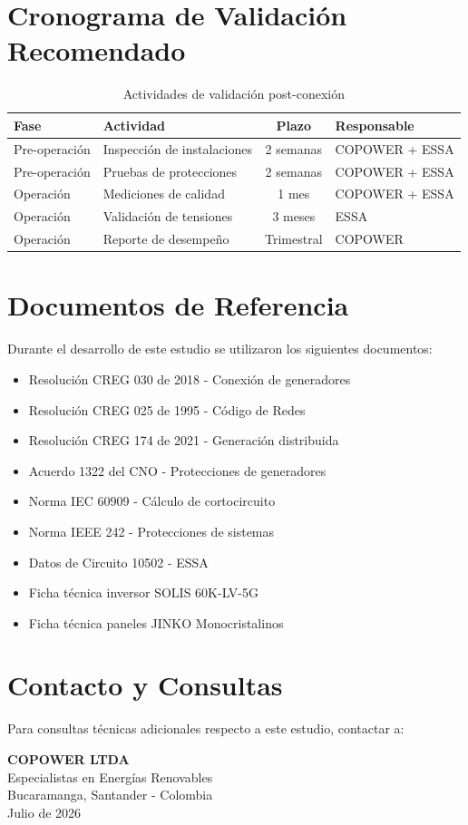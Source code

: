 \section{Cronograma de Validación Recomendado}

\begin{table}[H]
    \centering
    \caption{Actividades de validación post-conexión}
    \begin{tabular}{llcl}
    \toprule
    \textbf{Fase} & \textbf{Actividad} & \textbf{Plazo} & \textbf{Responsable} \\
    \midrule
    Pre-operación & Inspección de instalaciones & 2 semanas & COPOWER + ESSA \\
    Pre-operación & Pruebas de protecciones & 2 semanas & COPOWER + ESSA \\
    Operación & Mediciones de calidad & 1 mes & COPOWER + ESSA \\
    Operación & Validación de tensiones & 3 meses & ESSA \\
    Operación & Reporte de desempeño & Trimestral & COPOWER \\
    \bottomrule
    \end{tabular}
\end{table}

\section{Documentos de Referencia}

Durante el desarrollo de este estudio se utilizaron los siguientes documentos:

\begin{itemize}
    \item Resolución CREG 030 de 2018 - Conexión de generadores
    \item Resolución CREG 025 de 1995 - Código de Redes
    \item Resolución CREG 174 de 2021 - Generación distribuida
    \item Acuerdo 1322 del CNO - Protecciones de generadores
    \item Norma IEC 60909 - Cálculo de cortocircuito
    \item Norma IEEE 242 - Protecciones de sistemas
    \item Datos de Circuito 10502 - ESSA
    \item Ficha técnica inversor SOLIS 60K-LV-5G
    \item Ficha técnica paneles JINKO Monocristalinos
\end{itemize}

\section{Contacto y Consultas}

Para consultas técnicas adicionales respecto a este estudio, contactar a:

\begin{center}
    \textbf{COPOWER LTDA} \\
    Especialistas en Energías Renovables \\
    Bucaramanga, Santander - Colombia \\
    Julio de 2026
\end{center}
